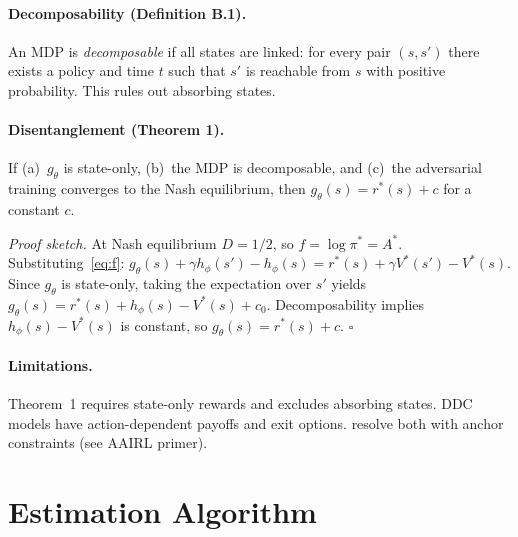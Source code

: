 \documentclass[11pt]{article}
\begin{document}
\paragraph{Decomposability (Definition B.1).}
An MDP is \emph{decomposable} if all states are linked: for every pair $(s, s')$ there exists a policy and time $t$ such that $s'$ is reachable from $s$ with positive probability.
This rules out absorbing states.

\paragraph{Disentanglement (Theorem 1).}
If (a)~$g_\theta$ is state-only, (b)~the MDP is decomposable, and (c)~the adversarial training converges to the Nash equilibrium, then $g_\theta(s) = r^*(s) + c$ for a constant $c$.

\emph{Proof sketch.}
At Nash equilibrium $D = 1/2$, so $f = \log \pi^* = A^*$.
Substituting~\eqref{eq:f}: $g_\theta(s) + \gamma h_\phi(s') - h_\phi(s) = r^*(s) + \gamma V^*(s') - V^*(s)$.
Since $g_\theta$ is state-only, taking the expectation over $s'$ yields $g_\theta(s) = r^*(s) + h_\phi(s) - V^*(s) + c_0$.
Decomposability implies $h_\phi(s) - V^*(s)$ is constant, so $g_\theta(s) = r^*(s) + c$. \hfill $\square$

\paragraph{Limitations.}
Theorem~1 requires state-only rewards and excludes absorbing states.
DDC models have action-dependent payoffs and exit options.
\citet{lee2026} resolve both with anchor constraints (see AAIRL primer).

\section{Estimation Algorithm}
\end{document}
